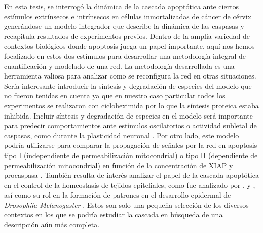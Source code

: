 En esta tesis, se interrogó la dinámica de la cascada apoptótica ante ciertos estímulos extrínsecos e intrínsecos en células inmortalizadas de cáncer de cérvix generándose un modelo integrador que describe la dinámica de las caspasas y recapitula resultados de experimentos previos. Dentro de la amplia variedad de contextos biológicos donde apoptosis juega un papel importante, aquí nos hemos focalizado en estos dos estímulos para desarrollar una metodología integral de cuantificación y modelado de una red. La metodología desarrollada es una herramienta valiosa para analizar como se reconfigura la red en otras situaciones. Sería interesante introducir la síntesis y degradación de especies del modelo que no fueron tenidas en cuenta ya que en nuestro caso particular todos los experimentos se realizaron con cicloheximida por lo que la síntesis proteica estaba inhibida. Incluir síntesis y degradación de especies en el modelo será importante para predecir comportamientos ante estímulos oscilatorios o actividad subletal de caspasas, como durante la plasticidad neuronal \citep{Unsain2015}. Por otro lado, este modelo podría utilizarse para comparar la propagación de señales por la red en apoptosis tipo I (independiente de permeabilización mitocondrial) o tipo II (dependiente de permeabilización mitocondrial) en función de la concentración de XIAP y procaspasa \citep{Aldridge2014}. También resulta de interés analizar el papel de la cascada apoptótica en el control de la homeostasis de tejidos epiteliales, como fue analizado por \cite{Gagliardi2021}, \cite{Aoki2013} y \cite{Albeck2013}, así como su rol en la formación de patrones en el desarrollo epidermal de \textit{Drosophila Melanogaster} \citep{Crossman2018}. Estos son solo una pequeña selección de los diversos contextos en los que se podría estudiar la cascada en búsqueda de una descripción aún más completa.






